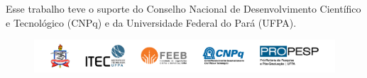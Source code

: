 

\begin{agradecimentos}

Esse trabalho teve o suporte do Conselho Nacional de Desenvolvimento Científico e Tecnológico (CNPq) e da Universidade Federal do Pará (UFPA).


\vfill

\begin{figure}[H]
    \centering
    \includegraphics{04-Figuras/Agradecimentos.png}
\end{figure}

\vfill


\end{agradecimentos}